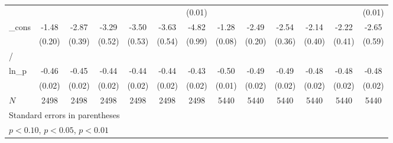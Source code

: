 \documentclass{article}
\begin{document}
{\begin{tabular}{l*{12}{c}}
            &                     &                     &                     &                     &                     &      (0.01)         &                     &                     &                     &                     &                     &      (0.01)         \\
[1em]
\_cons      &       -1.48\sym{***}&       -2.87\sym{***}&       -3.29\sym{***}&       -3.50\sym{***}&       -3.63\sym{***}&       -4.82\sym{***}&       -1.28\sym{***}&       -2.49\sym{***}&       -2.54\sym{***}&       -2.14\sym{***}&       -2.22\sym{***}&       -2.65\sym{***}\\
            &      (0.20)         &      (0.39)         &      (0.52)         &      (0.53)         &      (0.54)         &      (0.99)         &      (0.08)         &      (0.20)         &      (0.36)         &      (0.40)         &      (0.41)         &      (0.59)         \\
\hline
/           &                     &                     &                     &                     &                     &                     &                     &                     &                     &                     &                     &                     \\
ln\_p        &       -0.46\sym{***}&       -0.45\sym{***}&       -0.44\sym{***}&       -0.44\sym{***}&       -0.44\sym{***}&       -0.43\sym{***}&       -0.50\sym{***}&       -0.49\sym{***}&       -0.49\sym{***}&       -0.48\sym{***}&       -0.48\sym{***}&       -0.48\sym{***}\\
            &      (0.02)         &      (0.02)         &      (0.02)         &      (0.02)         &      (0.02)         &      (0.02)         &      (0.01)         &      (0.02)         &      (0.02)         &      (0.02)         &      (0.02)         &      (0.02)         \\
\hline
\(N\)       &        2498         &        2498         &        2498         &        2498         &        2498         &        2498         &        5440         &        5440         &        5440         &        5440         &        5440         &        5440         \\
\hline\hline
\multicolumn{13}{l}{\footnotesize Standard errors in parentheses}\\
\multicolumn{13}{l}{\footnotesize \sym{*} \(p<0.10\), \sym{**} \(p<0.05\), \sym{***} \(p<0.01\)}\\
\end{tabular}
}
\end{document}

